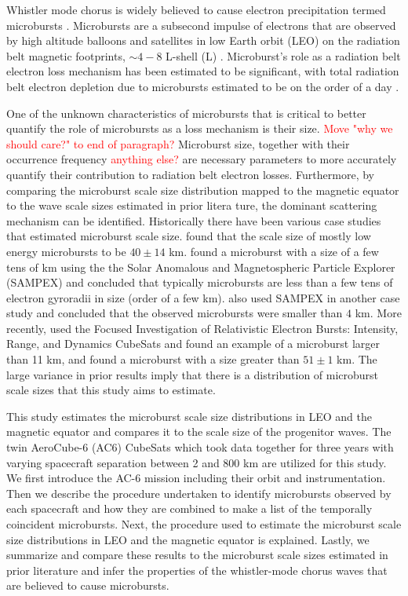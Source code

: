 \documentclass[draft]{agujournal2019}
\begin{document}
Whistler mode chorus is widely believed to cause electron precipitation termed microbursts \cite{Millan2007}. Microbursts are a subsecond impulse of electrons that are observed by high altitude balloons and satellites in low Earth orbit (LEO) on the radiation belt magnetic footprints, $\sim 4 - 8$ L-shell (L) \cite{Anderson1964, Parks1967, Woodger2015, Lorentzen2001a, Lorentzen2001b, O'Brien2003, O'Brien2004, Lee2005, Lee2012, Crew2016, Breneman2017, Mozer2018}. Microburst’s role as a radiation belt electron loss mechanism has been estimated to be significant, with total radiation belt electron depletion due to microbursts estimated to be on the order of a day \cite{Lorentzen2001b, O'Brien2004, Thorne2005, Breneman2017}. 

One of the unknown characteristics of microbursts that is critical to better quantify the role of microbursts as a loss mechanism is their size. \textcolor{red}{Move "why we should care?" to end of paragraph?} Microburst size, together with their occurrence frequency \textcolor{red}{anything else?} are necessary parameters to more accurately quantify their contribution to radiation belt electron losses. Furthermore, by comparing the microburst scale size distribution mapped to the magnetic equator to the wave scale sizes estimated in prior litera	ture, the dominant scattering mechanism can be identified. Historically there have been various case studies that estimated microburst scale size.  found that the scale size of mostly low energy microbursts to be $40 \pm 14$ km.  found a microburst with a size of a few tens of km using the the Solar Anomalous and Magnetospheric Particle Explorer (SAMPEX) and concluded that typically microbursts are less than a few tens of electron gyroradii in size (order of a few km).  also used SAMPEX in another case study and concluded that the observed microbursts were smaller than $4$ km. More recently,  used the Focused Investigation of Relativistic Electron Bursts: Intensity, Range, and Dynamics CubeSats and found an example of a microburst larger than 11 km, and  found a microburst with a size greater than $ 51 \pm 1$ km. The large variance in prior results imply that there is a distribution of microburst scale sizes that this study aims to estimate.

This study estimates the microburst scale size distributions in LEO and the magnetic equator and compares it to the scale size of the progenitor waves. The twin AeroCube-6 (AC6) CubeSats which took data together for three years with varying spacecraft separation between 2 and 800 km are utilized for this study. We first introduce the AC-6 mission including their orbit and instrumentation. Then we describe the procedure undertaken to identify microbursts observed by each spacecraft and how they are combined to make a list of the temporally coincident microbursts. Next, the procedure used to estimate the microburst scale size distributions in LEO and the magnetic equator is explained. Lastly, we summarize and compare these results to the microburst scale sizes estimated in prior literature and infer the properties of the whistler-mode chorus waves that are believed to cause microbursts. 
\end{document}
